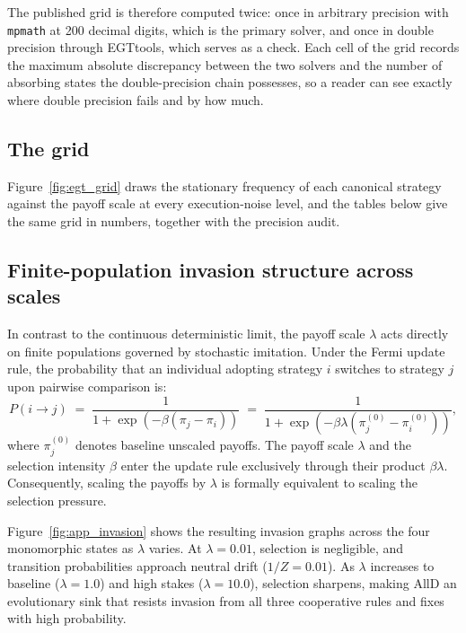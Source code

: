 \documentclass[openacc]{rsproca_new}
\newcommand{\lam}{\lambda}
\begin{document}
The published grid is therefore computed twice: once in arbitrary precision
with \texttt{mpmath} at 200 decimal digits, which is the primary solver, and
once in double precision through EGTtools, which serves as a check. Each cell
of the grid records the maximum absolute discrepancy between the two solvers
and the number of absorbing states the double-precision chain possesses, so a
reader can see exactly where double precision fails and by how much.

\subsection{The grid}\label{appendix:egt_grid}

Figure~\ref{fig:egt_grid} draws the stationary frequency of each canonical
strategy against the payoff scale at every execution-noise level, and the
tables below give the same grid in numbers, together with the precision audit.

\subsection{Finite-population invasion structure across scales}\label{appendix:egt_invasion}

In contrast to the continuous deterministic limit, the payoff scale $\lam$
acts directly on finite populations governed by stochastic imitation. Under the
Fermi update rule, the probability that an individual adopting strategy $i$
switches to strategy $j$ upon pairwise comparison is:
\begin{equation}
P(i \to j) \;=\; \frac{1}{1 + \exp\left(-\beta (\pi_j - \pi_i)\right)}
\;=\; \frac{1}{1 + \exp\left(-\beta \lam (\pi_j^{(0)} - \pi_i^{(0)})\right)},
\label{eq:fermi_scaling}
\end{equation}
where $\pi_j^{(0)}$ denotes baseline unscaled payoffs. The payoff scale $\lam$
and the selection intensity $\beta$ enter the update rule exclusively through
their product $\beta \lam$. Consequently, scaling the payoffs by $\lam$ is
formally equivalent to scaling the selection pressure.

Figure~\ref{fig:app_invasion} shows the resulting invasion graphs across the
four monomorphic states as $\lam$ varies. At $\lam = 0.01$, selection is
negligible, and transition probabilities approach neutral drift ($1/Z = 0.01$).
As $\lam$ increases to baseline ($\lam = 1.0$) and high stakes ($\lam = 10.0$),
selection sharpens, making AllD an evolutionary sink that resists invasion from
all three cooperative rules and fixes with high probability.
\end{document}
